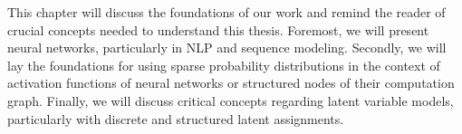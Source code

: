 \label{chap:background}

\cleardoublepage
\doublespacing

\noindent This chapter will discuss the foundations of our work and
remind the reader of crucial concepts needed to understand this
thesis. Foremost, we will present neural networks, particularly in
NLP and sequence modeling. Secondly, we will lay the foundations for
using sparse probability distributions in the context of activation
functions of neural networks or structured nodes of their computation
graph. Finally, we will discuss critical concepts regarding latent
variable models, particularly with discrete and structured latent
assignments.





\cleardoublepage
\singlespacing
